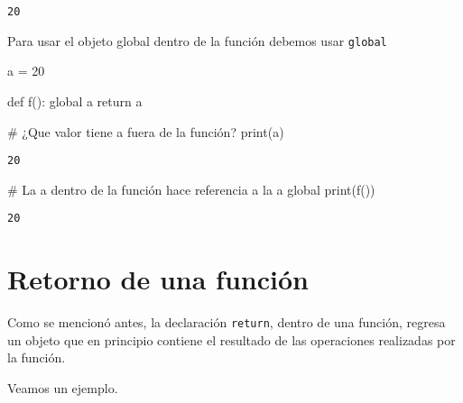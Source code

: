 \documentclass[
  letterpaper,
  DIV=11,
  numbers=noendperiod]{scrreprt}
\newenvironment{Shaded}{\begin{snugshade}}{\end{snugshade}}
\newcommand{\BuiltInTok}[1]{\textcolor[rgb]{0.00,0.23,0.31}{#1}}
\newcommand{\CommentTok}[1]{\textcolor[rgb]{0.37,0.37,0.37}{#1}}
\newcommand{\ControlFlowTok}[1]{\textcolor[rgb]{0.00,0.23,0.31}{#1}}
\newcommand{\DecValTok}[1]{\textcolor[rgb]{0.68,0.00,0.00}{#1}}
\newcommand{\KeywordTok}[1]{\textcolor[rgb]{0.00,0.23,0.31}{#1}}
\newcommand{\NormalTok}[1]{\textcolor[rgb]{0.00,0.23,0.31}{#1}}
\newcommand{\OperatorTok}[1]{\textcolor[rgb]{0.37,0.37,0.37}{#1}}
\begin{document}
\begin{verbatim}
20
\end{verbatim}

Para usar el objeto global dentro de la función debemos usar
\texttt{global}

\begin{Shaded}
\begin{Highlighting}[]
\NormalTok{a }\OperatorTok{=} \DecValTok{20}

\KeywordTok{def}\NormalTok{ f():}
    \KeywordTok{global}\NormalTok{ a }
    \ControlFlowTok{return}\NormalTok{ a}
\end{Highlighting}
\end{Shaded}

\begin{Shaded}
\begin{Highlighting}[]
\CommentTok{\# ¿Que valor tiene \textquotesingle{}a\textquotesingle{} fuera de la función?}
\BuiltInTok{print}\NormalTok{(a)}
\end{Highlighting}
\end{Shaded}

\begin{verbatim}
20
\end{verbatim}

\begin{Shaded}
\begin{Highlighting}[]
\CommentTok{\# La \textquotesingle{}a\textquotesingle{} dentro de la función hace referencia a la \textquotesingle{}a\textquotesingle{} global}
\BuiltInTok{print}\NormalTok{(f())}
\end{Highlighting}
\end{Shaded}

\begin{verbatim}
20
\end{verbatim}


\chapter{Retorno de una función}\label{retorno-de-una-funciuxf3n}

Como se mencionó antes, la declaración \texttt{return}, dentro de una
función, regresa un objeto que en principio contiene el resultado de las
operaciones realizadas por la función.

Veamos un ejemplo.
\end{document}

